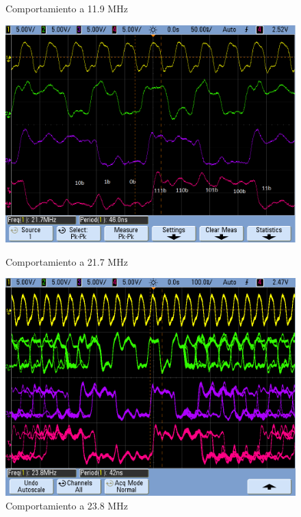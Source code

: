 \begin{figure}[H]
\begin{center}
\begin{minipage}[b]{0.4\textwidth}
  \caption{Comportamiento a 11.9 MHz}
  \label{7_fig5}
  \end{minipage}
  \begin{minipage}[b]{0.4\textwidth}
    \begin{center}
  		\includegraphics[scale=0.2]{ejercicio7/imagenes/async3.png}
	\end{center}
  \caption{Comportamiento a 21.7 MHz}
  \label{7_fig6}
 \end{minipage}
   \begin{minipage}[b]{0.4\textwidth}
    \begin{center}
  		\includegraphics[scale=0.2]{ejercicio7/imagenes/async4.png}
	\end{center}
  \caption{Comportamiento a 23.8 MHz}
  \label{7_fig7}
 \end{minipage}
\end{center}
\end{figure}

